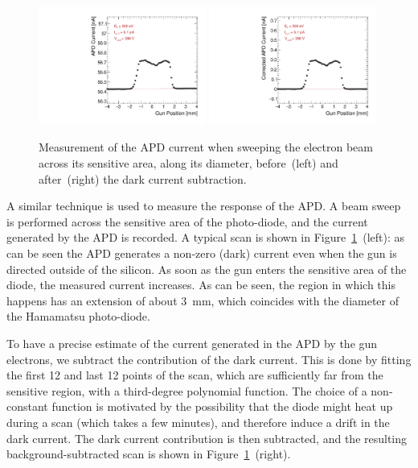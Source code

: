 \documentclass[12p]{paper}
\begin{document}
\begin{figure}[tb]
  \centering
\includegraphics[width=0.49\textwidth]{figures/scanAPD.pdf}
\includegraphics[width=0.49\textwidth]{figures/scanAPD_corr.pdf}
 \caption{Measurement of the APD current when sweeping the electron beam across its sensitive area, along its diameter, before~(left) and after~(right) the dark current subtraction.
  \label{fig:apd_scan}}
\end{figure}

A similar technique is used to measure the response of the APD. A beam sweep is performed across the sensitive area of the photo-diode, and the current generated by the APD is recorded. A typical scan is shown in Figure~\ref{fig:apd_scan}~(left): as can be seen the APD generates a non-zero (dark) current even when the gun is directed outside of the silicon. As soon as the gun enters the sensitive area of the diode, the measured current increases. As can be seen, the region in which this happens has an extension of about 3~mm, which coincides with the diameter of the Hamamatsu photo-diode.

To have a precise estimate of the current generated in the APD by the gun electrons, we subtract the contribution of the dark current. This is done by fitting the first 12 and last 12 points of the scan, which are sufficiently far from the sensitive region, with a third-degree polynomial function. The choice of a non-constant function is motivated by the possibility that the diode might heat up during a scan (which takes a few minutes), and therefore induce a drift in the dark current. The dark current contribution is then subtracted, and the resulting background-subtracted scan is shown in Figure~\ref{fig:apd_scan}~(right).
\end{document}
